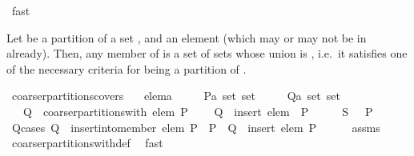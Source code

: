 \begin{isabellebody}
\ fast\isanewline
\ \ \isamarkupfalse%
\isanewline
{}\isamarkupfalse%
%
\endisatagproof
{\isafoldproof}%
%
\isadelimproof
%
\endisadelimproof
%
\begin{isamarkuptext}%
Let  be a partition of a set , and  an element (which may or may not be
  in  already).  Then, any member of  is a set of sets
  whose union is , i.e.\ it satisfies one of the necessary criteria for being a partition of .%
\end{isamarkuptext}%
\isamarkuptrue%
\isamarkupfalse%
\ coarser{\isacharunderscore}partitions{\isacharunderscore}covers{\isacharcolon}\isanewline
\ \ \ elem{\isacharcolon}{\isacharcolon}{\isacharprime}a\isanewline
\ \ \ \ \ P{\isacharcolon}{\isacharcolon}{\isachardoublequoteopen}{\isacharprime}a\ set\ set{\isachardoublequoteclose}\isanewline
\ \ \ \ \ Q{\isacharcolon}{\isacharcolon}{\isachardoublequoteopen}{\isacharprime}a\ set\ set{\isachardoublequoteclose}\isanewline
\ \ \ {\isachardoublequoteopen}Q\ {\isasymin}\ coarser{\isacharunderscore}partitions{\isacharunderscore}with\ elem\ P{\isachardoublequoteclose}\isanewline
\ \ \ {\isachardoublequoteopen}{\isasymUnion}\ Q\ {\isacharequal}\ insert\ elem\ {\isacharparenleft}{\isasymUnion}\ P{\isacharparenright}{\isachardoublequoteclose}\isanewline
%
\isadelimproof
%
\endisadelimproof
%
\isatagproof
{}\isamarkupfalse%
\ {\isacharminus}\isanewline
\ \ \isamarkupfalse%
\ {\isacharquery}S\ {\isacharequal}\ {\isachardoublequoteopen}{\isasymUnion}\ P{\isachardoublequoteclose}\isanewline
\ \ \isamarkupfalse%
\ Q{\isacharunderscore}cases{\isacharcolon}\ {\isachardoublequoteopen}Q\ {\isasymin}\ {\isacharparenleft}insert{\isacharunderscore}into{\isacharunderscore}member\ elem\ P{\isacharparenright}\ {\isacharbackquote}\ P\ {\isasymor}\ Q\ {\isacharequal}\ insert\ {\isacharbraceleft}elem{\isacharbraceright}\ P{\isachardoublequoteclose}\isanewline
\ \ \ \ \isamarkupfalse%
\ assms\ \isamarkupfalse%
\ coarser{\isacharunderscore}partitions{\isacharunderscore}with{\isacharunderscore}def\ \isamarkupfalse%
\ fast\isanewline
\ \ \isacommand{{\isacharbraceleft}}\isamarkupfalse%
\isanewline
\ \ \ \ \isamarkupfalse%

\end{isabellebody}
